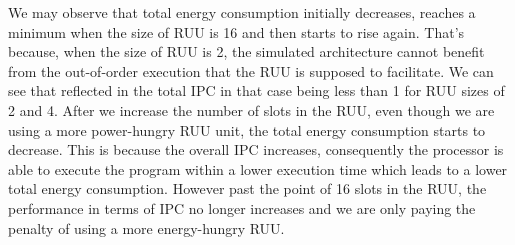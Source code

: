 \documentclass[11pt]{article}
\begin{document}
We may observe that total energy consumption initially decreases, reaches a
minimum when the size of RUU is 16 and then starts to rise again. That's
because, when the size of RUU is 2, the simulated architecture cannot benefit
from the out-of-order execution that the RUU is supposed to facilitate. We can
see that reflected in the total IPC in that case being less than 1 for RUU
sizes of 2 and 4. After we increase the number of slots in the RUU, even though
we are using a more power-hungry RUU unit, the total energy consumption starts
to decrease. This is because  the overall IPC increases, consequently the
processor is able to execute the program within a lower execution time which
leads to a lower total energy consumption. However past the point of 16 slots
in the RUU, the performance in terms of IPC no longer increases and we are only
paying the penalty of using a more energy-hungry RUU.

\vspace{-1em}
\end{document}
